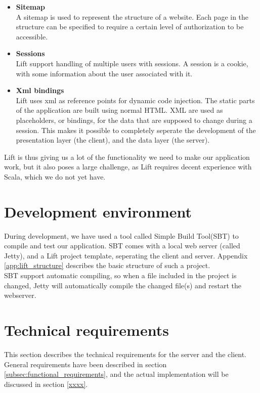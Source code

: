 \begin{itemize}
	\item \textbf{Sitemap}\\
	A sitemap is used to represent the structure of a website. Each page in the structure can be specified to require a certain level of authorization to be accessible. \\
	\item \textbf{Sessions}\\
	Lift support handling of multiple users with sessions. A session is a cookie, with some information about the user associated with it.\\
	\item \textbf{Xml bindings}\\
	Lift uses xml as reference points for dynamic code injection. The static parts of the application are built using normal HTML. XML are used as placeholders, or bindings, for the data that are supposed to change during a session. This makes it possible to completely seperate the development of the presentation layer (the client), and the data layer (the server).
\end{itemize}

Lift is thus giving us a lot of the functionality we need to make our application work, but it also poses a large challenge, as Lift requires decent experience with Scala, which we do not yet have.

\section{Development environment}
\label{sec:development_environment}
During development, we have used a tool called Simple Build Tool(SBT)\cite{sbt} to compile and test our application. SBT comes with a local web server (called Jetty), and a Lift project template, seperating the client and server. Appendix \ref{app:lift_structure} describes the basic structure of such a project.\\
SBT support automatic compiling, so when a file included in the project is changed, Jetty will automatically compile the changed file(s) and restart the webserver.

\section{Technical requirements}
\label{sec:tech_req}
This section describes the technical requirements for the server and the client. General requirements have been described in section \ref{subsec:functional_requirements}, and the actual implementation will be discussed in section \ref{xxxx}.


